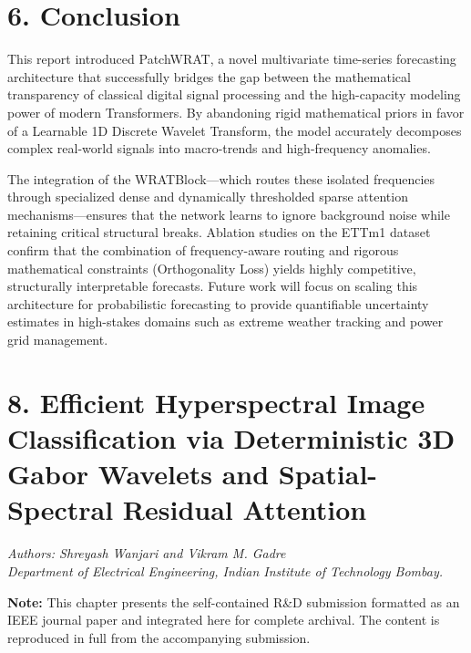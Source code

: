 \documentclass[11pt, letterpaper]{article}
\begin{document}
\section{6. Conclusion}
\label{sec:conclusion}

This report introduced PatchWRAT, a novel multivariate time-series forecasting architecture that successfully bridges the gap between the mathematical transparency of classical digital signal processing and the high-capacity modeling power of modern Transformers. By abandoning rigid mathematical priors in favor of a Learnable 1D Discrete Wavelet Transform, the model accurately decomposes complex real-world signals into macro-trends and high-frequency anomalies. 

The integration of the WRATBlock—which routes these isolated frequencies through specialized dense and dynamically thresholded sparse attention mechanisms—ensures that the network learns to ignore background noise while retaining critical structural breaks. Ablation studies on the ETTm1 dataset confirm that the combination of frequency-aware routing and rigorous mathematical constraints (Orthogonality Loss) yields highly competitive, structurally interpretable forecasts. Future work will focus on scaling this architecture for probabilistic forecasting to provide quantifiable uncertainty estimates in high-stakes domains such as extreme weather tracking and power grid management.


\newpage
\section{8. Efficient Hyperspectral Image Classification via Deterministic 3D Gabor Wavelets and Spatial-Spectral Residual Attention}
\label{sec:rnd}

\noindent\textit{Authors: Shreyash Wanjari and Vikram M. Gadre}\\
\textit{Department of Electrical Engineering, Indian Institute of Technology Bombay.}

\vspace{0.5em}
\noindent\textbf{Note:} This chapter presents the self-contained R\&D submission formatted as an IEEE journal paper and integrated here for complete archival. The content is reproduced in full from the accompanying submission.
\end{document}
